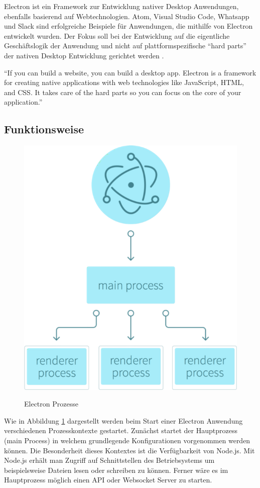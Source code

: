 Electron ist ein Framework zur Entwicklung nativer Desktop Anwendungen, ebenfalls basierend auf Webtechnologien.
Atom, Visual Studio Code, Whatsapp und Slack sind erfolgreiche Beispiele für Anwendungen, die mithilfe von Electron
entwickelt wurden.
Der Fokus soll bei der Entwicklung auf die eigentliche Geschäftslogik der Anwendung und nicht auf plattformspezifische
``hard parts'' der nativen Desktop Entwicklung gerichtet werden \cite{Elect57:online}.

\vspace{0.3cm}
``If you can build a website, you can build a desktop app. Electron is a framework for creating native applications
with web technologies like JavaScript, HTML, and CSS. It takes care of the hard parts so you can focus on the core of
your application.''
\cite{Elect57:online}

\subsection{Funktionsweise}
\label{sec:functionsweise}

\begin{figure}[htb]
 \centering
 \includegraphics[width=0.6\linewidth]{kapitel3/electron-context.png}
 \caption{Electron Prozesse}\cite{Build58:online}
\label{fig:electronprozess}
\end{figure}

Wie in Abbildung \ref{fig:electronprozess} dargestellt werden beim Start einer
Electron Anwendung verschiedenen Prozesskontexte gestartet.
Zunächst startet der Hauptprozess (main Process) in welchem grundlegende Konfigurationen vorgenommen werden können.
Die Besonderheit dieses Kontextes ist die Verfügbarkeit von Node.js.
Mit Node.js erhält man Zugriff auf Schnittstellen des Betriebsystems um beispielsweise Dateien lesen oder schreiben zu können.
Ferner wäre es im Hauptprozess möglich einen API oder Websocket Server zu starten.

